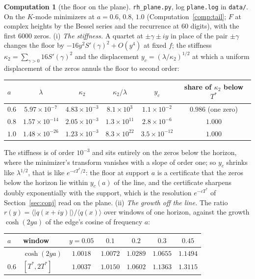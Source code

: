 \documentclass[11pt]{article}
\theoremstyle{definition}
\newtheorem{computation}[theorem]{Computation}
\theoremstyle{remark}
\newcommand{\Tst}{T^{*}}
\begin{document}
\begin{computation}[the floor on the plane]\label{comp:plane}
\texttt{rh\_plane.py}, log \texttt{plane.log} in \texttt{data/}. On the $K$-mode minimizers at $a=0.6$, $0.8$, $1.0$ (Computation~\ref{comp:tail}; $F$ at complex heights by the Bessel series and the recurrence at $60$ digits), with the first $6000$ zeros. (i) \emph{The stiffness.} A quartet at $\pm\gamma\pm iy$ in place of the pair $\pm\gamma$ changes the floor by $-16y^2S'(\gamma)^2+O(y^4)$ at fixed $f$; the stiffness $\kappa_2=\sum_{\gamma>0}16S'(\gamma)^2$ and the displacement $y_c=(\lambda/\kappa_2)^{1/2}$ at which a uniform displacement of the zeros annuls the floor to second order:
\begin{center}\footnotesize
\begin{tabular}{@{}lccccc@{}}
\toprule
$a$ & $\lambda$ & $\kappa_2$ & $\kappa_2/\lambda$ & $y_c$ & share of $\kappa_2$ below $\Tst$\\
\midrule
$0.6$ & $5.97\times10^{-7}$ & $4.83\times10^{-3}$ & $8.1\times10^{3}$ & $1.1\times10^{-2}$ & $0.986$ (one zero)\\
$0.8$ & $1.57\times10^{-14}$ & $2.05\times10^{-3}$ & $1.3\times10^{11}$ & $2.8\times10^{-6}$ & $1.000$\\
$1.0$ & $1.48\times10^{-26}$ & $1.23\times10^{-3}$ & $8.3\times10^{22}$ & $3.5\times10^{-12}$ & $1.000$\\
\bottomrule
\end{tabular}
\end{center}
The stiffness is of order $10^{-3}$ and sits entirely on the zeros below the horizon, where the minimizer's transform vanishes with a slope of order one; so $y_c$ shrinks like $\lambda^{1/2}$, that is like $e^{-c\Tst/2}$: the floor at support $a$ is a certificate that the zeros below the horizon lie within $y_c(a)$ of the line, and the certificate sharpens doubly exponentially with the support, which is the resolution $e^{-c\Tst}$ of Section~\ref{sec:conj} read on the plane. (ii) \emph{The growth off the line.} The ratio $r(y)=\langle|q(x+iy)|\rangle/\langle q(x)\rangle$ over windows of one horizon, against the growth $\cosh(2ya)$ of the edge's cosine of frequency $a$:
\begin{center}\footnotesize
\begin{tabular}{@{}llccccc@{}}
\toprule
$a$ & window & $y=0.05$ & $0.1$ & $0.2$ & $0.3$ & $0.45$\\
\midrule
 & $\cosh(2ya)$ & $1.0018$ & $1.0072$ & $1.0289$ & $1.0655$ & $1.1494$\\
$0.6$ & $[\Tst,2\Tst]$ & $1.0037$ & $1.0150$ & $1.0602$ & $1.1363$ & $1.3115$\\

\end{tabular}
\end{center}
\end{computation}
\end{document}
